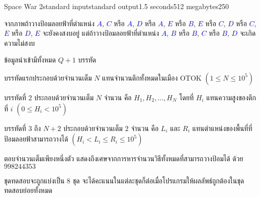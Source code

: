 \documentclass[11pt,a4paper]{article}
\begin{document}
\begin{problem}{Space War 2}{standard input}{standard output}{1.5 seconds}{512 megabytes}{250}
\begin{center}
{
} 
\end{center}

จากภาพถ้าวางป้อมลอยฟ้าที่ตำแหน่ง \textcolor{blue}{$A$}, \textcolor{blue}{$C$} หรือ \textcolor{blue}{$A$}, \textcolor{blue}{$D$} หรือ \textcolor{blue}{$A$}, \textcolor{blue}{$E$} หรือ \textcolor{blue}{$B$}, \textcolor{blue}{$E$} หรือ \textcolor{blue}{$C$}, \textcolor{blue}{$D$} หรือ \textcolor{blue}{$C$}, \textcolor{blue}{$E$} หรือ \textcolor{blue}{$D$}, \textcolor{blue}{$E$} จะยังคงสงบอยู่ แต่ถ้าวางป้อมลอยฟ้าที่ตำแหน่ง \textcolor{blue}{$A$}, \textcolor{blue}{$B$} หรือ \textcolor{blue}{$B$}, \textcolor{blue}{$C$} หรือ \textcolor{blue}{$B$}, \textcolor{blue}{$D$} จะเกิดความไม่สงบ

\InputFile
ข้อมูลนำเข้ามีทั้งหมด $Q+1$ บรรทัด

บรรทัดแรกประกอบด้วยจำนวนเต็ม $N$ แทนจำนวนตึกทั้งหมดในเมือง OTOK $(1\leq N\leq 10^{5})$

บรรทัดที่ $2$ ประกอบด้วยจำนวนเต็ม $N$ จำนวน คือ $H_1,H_2,\ldots,H_N$ โดยที่ $H_i$ แทนความสูงของตึกที่ $i$ $(0\leq H_i<10^5)$

บรรทัดที่ $3$ ถึง $N+2$ ประกอบด้วยจำนวนเต็ม $2$ จำนวน คือ $L_i$ และ $R_i$ แทนตำแหน่งของพื้นที่ที่ป้อมลอยฟ้าสามารถวางได้ $(H_i<L_i\leq R_i\leq 10^5)$

\OutputFile
ตอบจำนวนเต็มเพียงหนึ่งตัว แสดงถึงเศษจากการหารจำนวนวิธีทั้งหมดที่สามารถวางป้อมได้ ด้วย $998244353$

\Scoring
ชุดทดสอบจะถูกแบ่งเป็น 8 ชุด จะได้คะแนนในแต่ละชุดก็ต่อเมื่อโปรแกรมให้ผลลัพธ์ถูกต้องในชุดทดสอบย่อยทั้งหมด


\end{problem}
\end{document}
